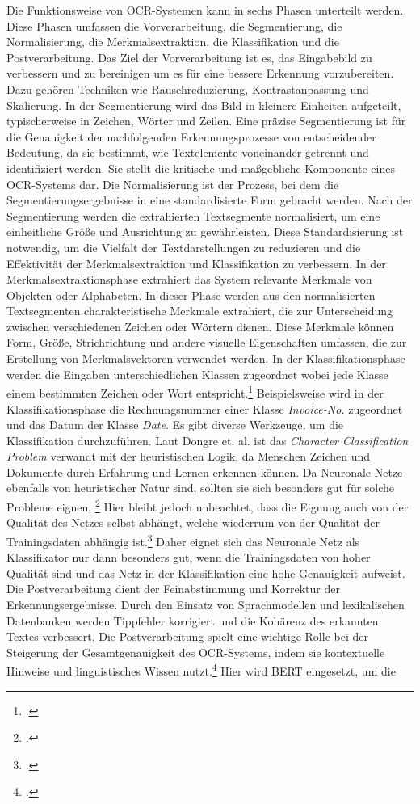 Die Funktionsweise von OCR-Systemen kann in sechs Phasen unterteilt werden. Diese Phasen umfassen die Vorverarbeitung, die Segmentierung, die Normalisierung, die Merkmalsextraktion, die Klassifikation und die Postverarbeitung. Das Ziel der Vorverarbeitung ist es, das Eingabebild zu verbessern und zu bereinigen um es für eine bessere Erkennung vorzubereiten. Dazu gehören Techniken wie Rauschreduzierung, Kontrastanpassung und Skalierung. In der Segmentierung wird das Bild in kleinere Einheiten aufgeteilt, typischerweise in Zeichen, Wörter und Zeilen. Eine präzise Segmentierung ist für die Genauigkeit der nachfolgenden Erkennungsprozesse von entscheidender Bedeutung, da sie bestimmt, wie Textelemente voneinander getrennt und identifiziert werden. Sie stellt die kritische und maßgebliche Komponente eines OCR-Systems dar. Die Normalisierung ist der Prozess, bei dem die Segmentierungsergebnisse in eine standardisierte Form gebracht werden. Nach der Segmentierung werden die extrahierten Textsegmente normalisiert, um eine einheitliche Größe und Ausrichtung zu gewährleisten. Diese Standardisierung ist notwendig, um die Vielfalt der Textdarstellungen zu reduzieren und die Effektivität der Merkmalsextraktion und Klassifikation zu verbessern. In der Merkmalsextraktionsphase extrahiert das System relevante Merkmale von Objekten oder Alphabeten. In dieser Phase werden aus den normalisierten Textsegmenten charakteristische Merkmale extrahiert, die zur Unterscheidung zwischen verschiedenen Zeichen oder Wörtern dienen. Diese Merkmale können Form, Größe, Strichrichtung und andere visuelle Eigenschaften umfassen, die zur Erstellung von Merkmalsvektoren verwendet werden. In der Klassifikationsphase werden die Eingaben unterschiedlichen Klassen zugeordnet wobei jede Klasse einem bestimmten Zeichen oder Wort entspricht.\footcites[Vgl.][S. 244]{hamad_detailed_2016} Beispielsweise wird in der Klassifikationsphase die Rechnungsnummer einer Klasse \emph{Invoice-No.} zugeordnet und das Datum der Klasse \emph{Date}. Es gibt diverse Werkzeuge, um die Klassifikation durchzuführen. Laut Dongre et. al. ist das \emph{Character Classification Problem} verwandt mit der heuristischen Logik, da Menschen Zeichen und Dokumente durch Erfahrung und Lernen erkennen können. Da Neuronale Netze ebenfalls von heuristischer Natur sind, sollten sie sich besonders gut für solche Probleme eignen. \footcites[Vgl.][S. 11]{dongre_review_2010} Hier bleibt jedoch unbeachtet, dass die Eignung auch von der Qualität des Netzes selbst abhängt, welche wiederrum von der Qualität der Trainingsdaten abhängig ist.\footcites[Vgl.][S. 851]{kavzoglu_increasing_2009} Daher eignet sich das Neuronale Netz als Klassifikator nur dann besonders gut, wenn die Trainingsdaten von hoher Qualität sind und das Netz in der Klassifikation eine hohe Genauigkeit aufweist. Die Postverarbeitung dient der Feinabstimmung und Korrektur der Erkennungsergebnisse. Durch den Einsatz von Sprachmodellen und lexikalischen Datenbanken werden Tippfehler korrigiert und die Kohärenz des erkannten Textes verbessert. Die Postverarbeitung spielt eine wichtige Rolle bei der Steigerung der Gesamtgenauigkeit des OCR-Systems, indem sie kontextuelle Hinweise und linguistisches Wissen nutzt.\footcites[Vgl.][S. 246 f.]{hamad_detailed_2016} Hier wird \ac{BERT} eingesetzt, um die 